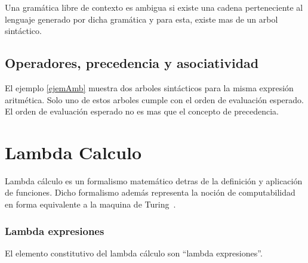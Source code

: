 \begin{defi}
  Una gramática libre de contexto es ambigua si existe una cadena perteneciente al
  lenguaje generado por dicha gramática y para esta, existe mas de un arbol sintáctico.
\end{defi}

\subsection{Operadores, precedencia y asociatividad}

El ejemplo \ref{ejemAmb} muestra dos arboles sintácticos para la misma
expresión aritmética. Solo uno de estos arboles cumple con el orden de evaluación
esperado. El orden de evaluación esperado no es mas que el concepto de precedencia.

\section{Lambda Calculo}
Lambda cálculo es un formalismo matemático detras de la definición y aplicación de
funciones. Dicho formalismo además representa la noción de computabilidad en forma
equivalente a la maquina de Turing~\cite{henk:lambda}.

\subsubsection{Lambda expresiones}

El elemento constitutivo del lambda cálculo son ``lambda expresiones''.

